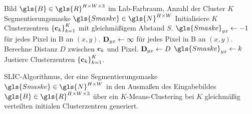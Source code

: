 \begin{algorithm}[t]
\centering
\begin{algorithmic}
  \REQUIRE{} Bild $\gls{B} \in \gls{R}^{H \times W \times 3}$ im Lab-Farbraum, Anzahl der Cluster $K$
  \ENSURE{} Segmentierungsmaske $\gls{Smaske} \in \gls{N}^{H \times W}$
  \STATE{} Initialisiere $K$ Clusterzentren ${\left\{\ve{c}_k\right\}}_{k=1}^K$ mit gleichmäßigem Abstand $S$.
  \STATE{} $\gls{Smaske}_{yx} \leftarrow -1$ für jedes Pixel in \gls{B} an $\left(x,y\right)$.
  \STATE{} $\mathbf{D}_{yx} \leftarrow \infty$ für jedes Pixel in \gls{B} an $\left(x,y\right)$.
  \REPEAT{}
        \STATE{} Berechne Distanz $D$ zwischen $\mathbf{c}_k$ und Pixel.
          \STATE{} $\mathbf{D}_{yx} \leftarrow D$
          \STATE{} $\gls{Smaske}_{yx} \leftarrow k$
        \ENDIF{}
      \ENDFOR{}
    \ENDFOR{}
    \STATE{} Justiere Clusterzentren ${\left\{\ve{c}_k\right\}}_{k=1}^K$.
\end{algorithmic}
  \caption[\gls{SLIC}]{\gls{SLIC}-Algorithmus, der eine Segmentierungsmaske $\gls{Smaske} \in \gls{N}^{H \times W}$ in den Ausmaßen des Eingabebildes $\gls{B} \in \gls{R}^{H \times W \times 3}$ über ein $K$-Means-Clustering bei $K$ gleichmäßig verteilten initialen Clusterzentren generiert.}
\label{alg:slic}
\end{algorithm}

